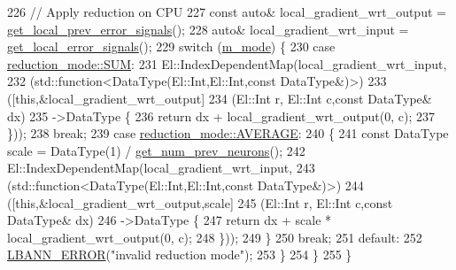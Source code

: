 \begin{DoxyCode}
226       \textcolor{comment}{// Apply reduction on CPU}
227       \textcolor{keyword}{const} \textcolor{keyword}{auto}& local\_gradient\_wrt\_output = \hyperlink{classlbann_1_1Layer_a82827edc5e869960144f3ccb2172bfcd}{get\_local\_prev\_error\_signals}();
228       \textcolor{keyword}{auto}& local\_gradient\_wrt\_input = \hyperlink{classlbann_1_1Layer_af178d00b9d878aa7d87754bff2a91f3a}{get\_local\_error\_signals}();
229       \textcolor{keywordflow}{switch} (\hyperlink{classlbann_1_1reduction__layer_aa8c753154fec05a00ede9217df3ba638}{m\_mode}) \{
230       \textcolor{keywordflow}{case} \hyperlink{namespacelbann_a5975e1fb530a267728bfb01dc5c1be9ba6970bdc2201030b9c03fbdcf3973858a}{reduction\_mode::SUM}:
231         El::IndexDependentMap(local\_gradient\_wrt\_input,
232                               (std::function<DataType(El::Int,El::Int,\textcolor{keyword}{const} DataType&)>)
233                               ([\textcolor{keyword}{this},&local\_gradient\_wrt\_output]
234                                (El::Int r, El::Int c,\textcolor{keyword}{const} DataType& dx)
235                                ->DataType \{
236                                 \textcolor{keywordflow}{return} dx + local\_gradient\_wrt\_output(0, c);
237                               \}));
238         \textcolor{keywordflow}{break};
239       \textcolor{keywordflow}{case} \hyperlink{namespacelbann_a5975e1fb530a267728bfb01dc5c1be9ba16de38737a9f8366e9b2042b4e9b6290}{reduction\_mode::AVERAGE}:
240         \{
241           \textcolor{keyword}{const} DataType scale = DataType(1) / \hyperlink{classlbann_1_1Layer_a27112eb70bbfbd7f3c3e749960400dec}{get\_num\_prev\_neurons}();
242           El::IndexDependentMap(local\_gradient\_wrt\_input,
243                                 (std::function<DataType(El::Int,El::Int,\textcolor{keyword}{const} DataType&)>)
244                                 ([\textcolor{keyword}{this},&local\_gradient\_wrt\_output,scale]
245                                  (El::Int r, El::Int c,\textcolor{keyword}{const} DataType& dx)
246                                  ->DataType \{
247                                   \textcolor{keywordflow}{return} dx + scale * local\_gradient\_wrt\_output(0, c);
248                                 \}));
249         \}
250         \textcolor{keywordflow}{break};
251       \textcolor{keywordflow}{default}:
252         \hyperlink{base_8hpp_a80b1d707117e968a6951b7222e4b2b87}{LBANN\_ERROR}(\textcolor{stringliteral}{"invalid reduction mode"});
253       \}
254     \}
255   \}
\end{DoxyCode}
\mbox{\label{classlbann_1_1reduction__layer_a5a47c9c732716928131445230ef97af6}} 
